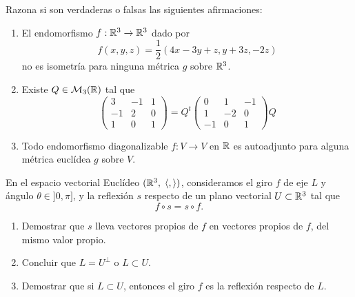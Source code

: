 \documentclass[12pt]{article}
\begin{document}
    \begin{ejercicio}
        Razona si son verdaderas o falsas las siguientes afirmaciones:
        \begin{enumerate}
            \item El endomorfismo $f:\mathbb{R}^3\to \mathbb{R}^3$ dado por
            \begin{equation*}
                f(x,y,z)=\frac{1}{2}(4x-3y+z,y+3z,-2z)
            \end{equation*}
            no es isometría para ninguna métrica $g$ sobre $\mathbb{R}^3$.

            \item Existe $Q\in \mathcal{M}_3(\mathbb{R})$ tal que
            \begin{equation*}
                \left(\begin{array}{ccc}
                    3 & -1 & 1 \\
                    -1 & 2 & 0 \\
                    1 & 0 & 1
                \end{array}\right)
                = Q^t
                \left(\begin{array}{ccc}
                    0 & 1 & -1 \\
                    1 & -2 & 0 \\
                    -1 & 0 & 1
                \end{array}\right)
                Q
            \end{equation*}

            \item Todo endomorfismo diagonalizable $f:V\to V$ en $\mathbb{R}$ es autoadjunto para alguna métrica euclídea $g$ sobre $V$.
        \end{enumerate}
    \end{ejercicio}

    \begin{ejercicio}
        En el espacio vectorial Euclídeo $(\mathbb{R}^3,\;\langle, \rangle)$, consideramos el giro $f$ de eje $L$ y ángulo $\theta\in ]0,\pi]$, y la reflexión $s$ respecto de un plano vectorial $U\subset \mathbb{R}^3$ tal que
        \begin{equation*}
            f\circ s = s\circ f.
        \end{equation*}
        \begin{enumerate}
            \item Demostrar que $s$ lleva vectores propios de $f$ en vectores propios de $f$, del mismo valor propio.
            \item Concluir que $L=U^\perp$ o $L\subset U$.
            \item Demostrar que si $L\subset U$, entonces el giro $f$ es la reflexión respecto de $L$.
        \end{enumerate}
    \end{ejercicio}
\end{document}
